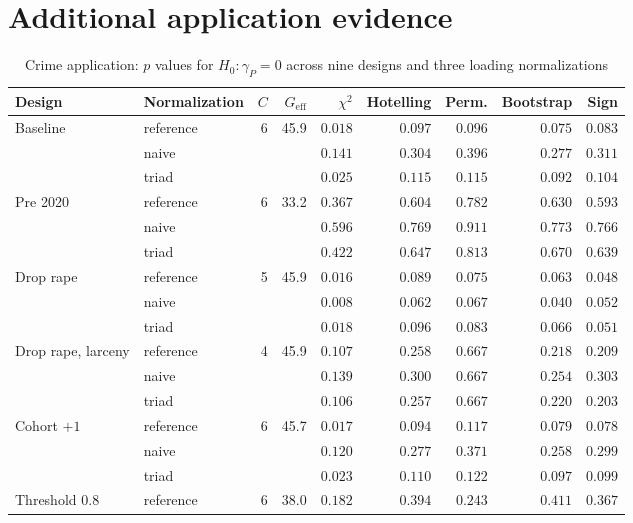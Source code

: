 \documentclass[12pt]{article}
\theoremstyle{definition}
\numberwithin{equation}{section}
\begin{document}
\section{Additional application evidence}

\begin{table}[htbp]
\centering
\caption{Crime application: $p$ values for $H_0: \gamma_P = 0$ across nine
designs and three loading normalizations}
\label{tab:appdesigns}
\footnotesize
\begin{tabular}{llrrrrrrr}
\toprule
Design & Normalization & $C$ & $G_{\mathrm{eff}}$ & $\chi^2$ & Hotelling
 & Perm. & Bootstrap & Sign \\
\midrule
Baseline & reference & 6 & 45.9 & $0.018$ & $0.097$ & $0.096$ & $0.075$ & $0.083$ \\
 & naive &  &  & $0.141$ & $0.304$ & $0.396$ & $0.277$ & $0.311$ \\
 & triad &  &  & $0.025$ & $0.115$ & $0.115$ & $0.092$ & $0.104$ \\
\addlinespace
Pre 2020 & reference & 6 & 33.2 & $0.367$ & $0.604$ & $0.782$ & $0.630$ & $0.593$ \\
 & naive &  &  & $0.596$ & $0.769$ & $0.911$ & $0.773$ & $0.766$ \\
 & triad &  &  & $0.422$ & $0.647$ & $0.813$ & $0.670$ & $0.639$ \\
\addlinespace
Drop rape & reference & 5 & 45.9 & $0.016$ & $0.089$ & $0.075$ & $0.063$ & $0.048$ \\
 & naive &  &  & $0.008$ & $0.062$ & $0.067$ & $0.040$ & $0.052$ \\
 & triad &  &  & $0.018$ & $0.096$ & $0.083$ & $0.066$ & $0.051$ \\
\addlinespace
Drop rape, larceny & reference & 4 & 45.9 & $0.107$ & $0.258$ & $0.667$ & $0.218$ & $0.209$ \\
 & naive &  &  & $0.139$ & $0.300$ & $0.667$ & $0.254$ & $0.303$ \\
 & triad &  &  & $0.106$ & $0.257$ & $0.667$ & $0.220$ & $0.203$ \\
\addlinespace
Cohort $+1$ & reference & 6 & 45.7 & $0.017$ & $0.094$ & $0.117$ & $0.079$ & $0.078$ \\
 & naive &  &  & $0.120$ & $0.277$ & $0.371$ & $0.258$ & $0.299$ \\
 & triad &  &  & $0.023$ & $0.110$ & $0.122$ & $0.097$ & $0.099$ \\
\addlinespace
Threshold $0.8$ & reference & 6 & 38.0 & $0.182$ & $0.394$ & $0.243$ & $0.411$ & $0.367$ \\

\end{tabular}
\end{table}
\end{document}
